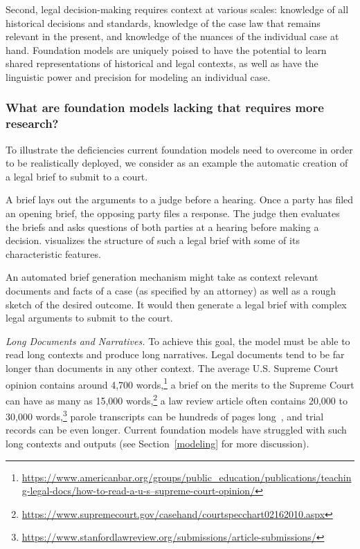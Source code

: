 Second, legal decision-making requires context at various scales: knowledge of all historical decisions and standards, knowledge of the case law that remains relevant in the present, and knowledge of the nuances of the individual case at hand. Foundation models are uniquely poised to have the potential to learn shared representations of historical and legal contexts, as well as have the linguistic power and precision for modeling an individual case. 

\subsubsection{What are foundation models lacking that requires more research?}

To illustrate the deficiencies current foundation models need to overcome in order to be realistically deployed, we consider as an example the automatic creation of a legal brief to submit to a court.

A brief lays out the arguments to a judge before a hearing. Once a party has filed an opening brief, the opposing party files a response. The judge then evaluates the briefs and asks questions of both parties at a hearing before making a decision.  visualizes the structure of such a legal brief with some of its characteristic features.

An automated brief generation mechanism might take as context relevant documents and facts of a case (as specified by an attorney) as well as a rough sketch of the desired outcome. It would then generate a legal brief with complex legal arguments to submit to the court. 
\medskip

\textit{Long Documents and Narratives.} To achieve this goal, the model must be able to read long contexts and produce long narratives. Legal documents tend to be far longer than documents in any other context. The average U.S. Supreme Court opinion contains around 4,700 words,\footnote{\href{https://www.americanbar.org/groups/public\_education/publications/teaching-legal-docs/how-to-read-a-u-s--supreme-court-opinion/}{https://www.americanbar.org/groups/public\_education/publications/teaching-legal-docs/how-to-read-a-u-s--supreme-court-opinion/}} a brief on the merits to the Supreme Court can have as many as 15,000 words,\footnote{\href{https://www.supremecourt.gov/casehand/courtspecchart02162010.aspx}{https://www.supremecourt.gov/casehand/courtspecchart02162010.aspx}}
a law review article often contains 20,000 to 30,000 words,\footnote{\href{https://www.stanfordlawreview.org/submissions/article-submissions/}{https://www.stanfordlawreview.org/submissions/article-submissions/}}
parole transcripts can be hundreds of pages long~\citep{bell2021recon}, and trial records can be even longer. Current foundation models have struggled with such long contexts and outputs (see Section~\ref{modeling} for more discussion).
\medskip


